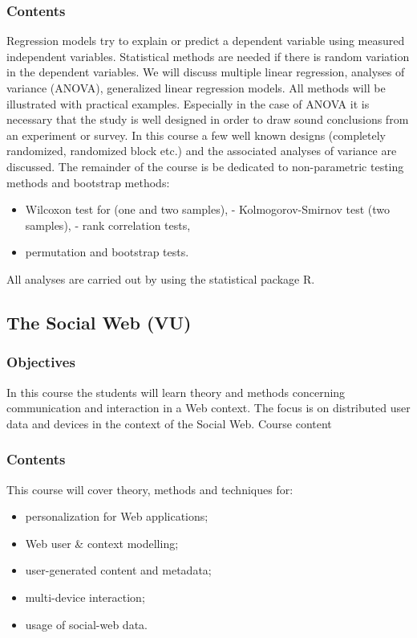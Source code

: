 \documentclass[11pt]{article}
\begin{document}
\subsubsection{Contents}
\label{sec:org97d9f42}

Regression models try to explain or predict a dependent variable using measured
independent variables. Statistical methods are needed if there is random
variation in the dependent variables. We will discuss multiple linear
regression, analyses of variance (ANOVA), generalized linear regression models.
All methods will be illustrated with practical examples. Especially in the case
of ANOVA it is necessary that the study is well designed in order to draw sound
conclusions from an experiment or survey. In this course a few well known
designs (completely randomized, randomized block etc.) and the associated
analyses of variance are discussed. The remainder of the course is be dedicated
to non-parametric testing methods and bootstrap methods:
\begin{itemize}
\item Wilcoxon test for (one and two samples), - Kolmogorov-Smirnov test (two
samples), - rank correlation tests,
\item permutation and bootstrap tests.
\end{itemize}
All analyses are carried out by using the statistical package R.

\subsection{The Social Web (VU)}
\label{sec:orga40894f}

\subsubsection{Objectives}
\label{sec:org97e6702}

In this course the students will learn theory and methods concerning
communication and interaction in a Web context. The focus is on
distributed user data and devices in the context of the Social Web.
Course content

\subsubsection{Contents}
\label{sec:orgd431034}

This course will cover theory, methods and techniques for:

\begin{itemize}
\item personalization for Web applications;
\item Web user \& context modelling;
\item user-generated content and metadata;
\item multi-device interaction;
\item usage of social-web data.
\end{itemize}
\end{document}
